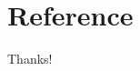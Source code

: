 \documentclass{beamer}
\begin{document}
\section{Reference}

\begin{frame}[allowframebreaks]
    
    
\end{frame}

\begin{frame}
    \begin{center}
        {\Huge\calligra Thanks!}\cite{origin}
    \end{center}
\end{frame}
\end{document}
